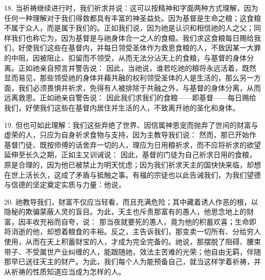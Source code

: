 18. 当祈祷继续进行时，我们祈求并说：这可以按精神和字面两种方式理解，因为任何一种理解对于我们得救都具有丰富的神圣益处。因为基督是生命之粮；这食粮不属于众人，而是属于我们的。正如我们说，因为祂是认识和相信祂的人之父；同样我们也称它为，因为基督是与祂身体合一之人的食粮。我们求这食粮每日赐给我们，好使我们这些在基督内，并每日领受圣体作为救恩食粮的人，不致因某一大罪的中阻，因被阻止、扣留而不领受，从而无法分沾天上的食粮，与基督的身体分离。正如祂亲自预言并警告说：  因此，当祂说，谁若吃祂的粮将永远活着，既然显而易见，那些领受祂的身体并藉共融的权利领受圣体的人是生活的，那么另一方面，我们必须畏惧并祈求，免得有人被排除于共融之外，与基督的身体分离，从而远离救恩。正如祂亲自警告说：  因此我们求我们的食粮——即基督——每日赐给我们，好使我们这些在基督内居住并生活的人，不致离开祂的圣化和身体。\par

19. 但也可如此理解：我们这些弃绝了世界、因信属神恩宠而抛弃了世间的财富与虚荣的人，只应为自身祈求食物与支持，因为主教导我们说：\newline{} 然而，那已开始作基督门徒、既按师傅的话舍弃一切的人，理应为日用粮祈求，而不应将祈求的欲望延伸至长久之期，正如主又训诫说：\newline{} 因此，基督的门徒为自己祈求日用的食粮，原是合理的，因为他已被禁止为明天忧虑；因为我们祈求天主的国快快来临，却想在世上活长久，这成了矛盾与抵触之事。有福的宗徒也以此告诫我们，为我们望德与信德的坚定奠定实质与力量：他说，\newline{}\par

20. 祂教导我们，财富不仅应当轻看，而且充满危险；其中藏着诱人作恶的根，以隐秘的欺骗蒙蔽人灵的盲目。为此，天主也斥责那富有的愚人，他思念地上的财富，因丰收充裕而自夸，说：\newline{} 那当夜就要死的愚人，竟为他的积蓄欢喜；生命即将消逝的他，却想着粮食的丰裕。反之，主告诉我们，那变卖一切所有、分给穷人使用，从而在天上积蓄财宝的人，才成为完全完备的。祂说，那摆脱了阻碍、腰束带子、不受属世产业纠缠的人，能跟随祂，效法主苦难的光荣；他自由无羁，伴随那早已送往天主的财产。为此，我们每个人为能预备自己，就当这样学着祈祷，并从祈祷的性质知道应当成为怎样的人。\par

